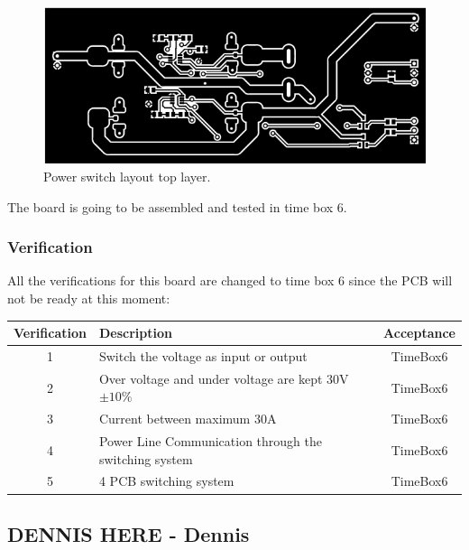 \begin{figure}[H]
	\begin{centering}
		\includegraphics[width=1.0\textwidth]{images/tb5_layout_top.png}
		\caption{Power switch layout top layer.}
	\end{centering}
\end{figure}

The board is going to be assembled and tested in time box 6.

\subsubsection{Verification}
All the verifications for this board are changed to time box 6 since the PCB will not be ready at this moment:
\begin{table}[H]
\centering
	\begin{tabular}{| c | l | c |}
		\hline
		Verification & Description & Acceptance \\\hline
		1 & Switch the voltage as input or output & TimeBox6 \\\hline
		2 & Over voltage and under voltage are kept 30V $ \pm10\% $ & TimeBox6 \\\hline
		3 & Current between maximum 30A & TimeBox6 \\\hline
		4 & Power Line Communication through the switching system & TimeBox6 \\\hline
		5 & 4 PCB switching system & TimeBox6 \\\hline
	\end{tabular}
\end{table}
%
%
\subsection{DENNIS HERE - Dennis} 
